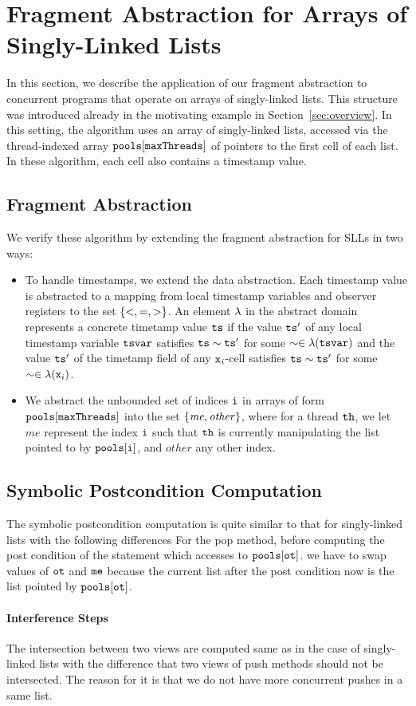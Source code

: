 \section{Fragment Abstraction for Arrays of Singly-Linked Lists}
\label{sec:list-arrays}
In this section, we describe the application of our fragment abstraction to concurrent programs that operate on arrays of singly-linked lists. This structure
was introduced already in the motivating example in
Section~\ref{sec:overview}.
In this setting, the algorithm uses an array of singly-linked lists, accessed via the thread-indexed array ${\tt pools[maxThreads]}$ of pointers to the first cell of each list. In these algorithm, each cell also contains a timestamp value.

\subsection{Fragment Abstraction}
We verify these algorithm by extending the fragment abstraction for SLLs in
two ways:
\begin{itemize}
\item   To handle timestamps, we extend the data abstraction. Each timestamp value is abstracted to a mapping from local timestamp variables and observer
  registers to the set $\left\{<,=,>\right\}$.
  An element $\lambda$ in the abstract domain represents a concrete timetamp value $\tt ts$ if the value $\tt ts'$ of any local timestamp variable
  $\mathtt{tsvar}$ satisfies $\tt ts \sim ts'$ for some $\sim \in
  \lambda(\mathtt{tsvar})$ and the value $\tt ts'$ of the timetamp field
  of any $\mathtt{x}_i$-cell satisfies $\tt ts \sim ts'$ for some $\sim \in
  \lambda(\mathtt{x}_i)$.
\item
  We abstract the unbounded set of indices $\tt i$ in arrays of form
  $\tt pools[maxThreads]$ into the set $\left\{\mathit{me},\mathit{other}\right\}$, where
  for a thread ${\tt th}$, we let $\mathit{me}$ represent the index
  $\tt i$ such that ${\tt th}$ is currently manipulating the list pointed to
  by $\tt pools[i]$, and $\mathit{other}$ any other index.
\end{itemize}

\subsection{Symbolic Postcondition Computation}
The symbolic postcondition computation is quite similar to that for singly-linked lists with the following differences
For the pop method, before computing the post condition of the statement which accesses to $\tt pools[ot]$. we have to swap values of $\tt ot$ and $\tt me$ because the current list after the post condition now is the list pointed by $\tt pools[ot]$.  

\paragraph{Interference Steps} 
The intersection between two views are computed same as in the case of singly-linked lists with the difference that two views of push methods should not be intersected. The reason for it is that we do not have more concurrent pushes in a same list.








